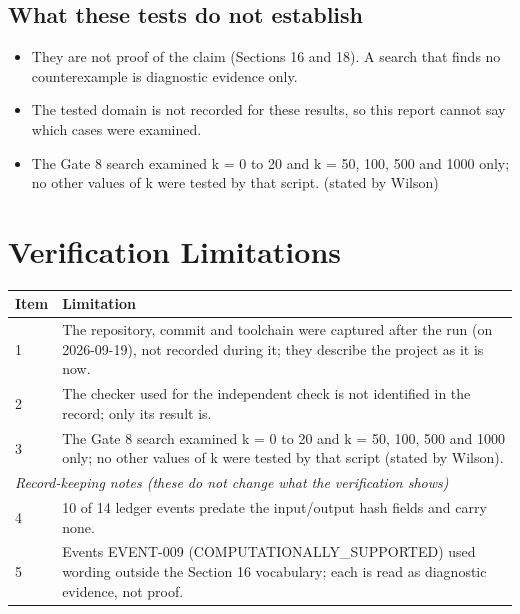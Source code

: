 \documentclass[11pt]{article}
\begin{document}
\subsection*{What these tests do not establish}
\begin{itemize}
\item They are not proof of the claim (Sections 16 and 18). A search that finds no counterexample is diagnostic evidence only.
\item The tested domain is not recorded for these results, so this report cannot say which cases were examined.
\item The Gate 8 search examined k = 0 to 20 and k = 50, 100, 500 and 1000 only; no other values of k were tested by that script. (stated by Wilson)
\end{itemize}
\section{Verification Limitations}
\begin{longtable}{p{}p{}}
\toprule Item & Limitation \\ \midrule \endhead
1 & The repository, commit and toolchain were captured after the run (on 2026-09-19), not recorded during it; they describe the project as it is now. \\
2 & The checker used for the independent check is not identified in the record; only its result is. \\
3 & The Gate 8 search examined k = 0 to 20 and k = 50, 100, 500 and 1000 only; no other values of k were tested by that script (stated by Wilson). \\
\midrule \multicolumn{2}{l}{\textit{Record-keeping notes (these do not change what the verification shows)}} \\ \midrule
4 & 10 of 14 ledger events predate the input/output hash fields and carry none. \\
5 & Events EVENT-009 (COMPUTATIONALLY\_SUPPORTED) used wording outside the Section 16 vocabulary; each is read as diagnostic evidence, not proof. \\
\bottomrule
\end{longtable}
\end{document}
